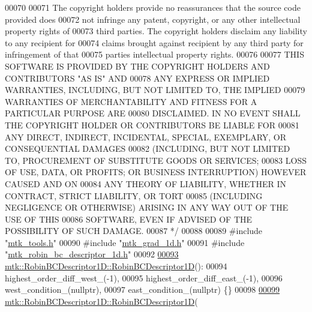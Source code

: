 \begin{DoxyCode}
00070 \textcolor{comment}{}
00071 \textcolor{comment}{The copyright holders provide no reassurances that the source code provided does}
00072 \textcolor{comment}{not infringe any patent, copyright, or any other intellectual property rights of}
00073 \textcolor{comment}{third parties. The copyright holders disclaim any liability to any recipient for}
00074 \textcolor{comment}{claims brought against recipient by any third party for infringement of that}
00075 \textcolor{comment}{parties intellectual property rights.}
00076 \textcolor{comment}{}
00077 \textcolor{comment}{THIS SOFTWARE IS PROVIDED BY THE COPYRIGHT HOLDERS AND CONTRIBUTORS "AS IS" AND}
00078 \textcolor{comment}{ANY EXPRESS OR IMPLIED WARRANTIES, INCLUDING, BUT NOT LIMITED TO, THE IMPLIED}
00079 \textcolor{comment}{WARRANTIES OF MERCHANTABILITY AND FITNESS FOR A PARTICULAR PURPOSE ARE}
00080 \textcolor{comment}{DISCLAIMED. IN NO EVENT SHALL THE COPYRIGHT HOLDER OR CONTRIBUTORS BE LIABLE FOR}
00081 \textcolor{comment}{ANY DIRECT, INDIRECT, INCIDENTAL, SPECIAL, EXEMPLARY, OR CONSEQUENTIAL DAMAGES}
00082 \textcolor{comment}{(INCLUDING, BUT NOT LIMITED TO, PROCUREMENT OF SUBSTITUTE GOODS OR SERVICES;}
00083 \textcolor{comment}{LOSS OF USE, DATA, OR PROFITS; OR BUSINESS INTERRUPTION) HOWEVER CAUSED AND ON}
00084 \textcolor{comment}{ANY THEORY OF LIABILITY, WHETHER IN CONTRACT, STRICT LIABILITY, OR TORT}
00085 \textcolor{comment}{(INCLUDING NEGLIGENCE OR OTHERWISE) ARISING IN ANY WAY OUT OF THE USE OF THIS}
00086 \textcolor{comment}{SOFTWARE, EVEN IF ADVISED OF THE POSSIBILITY OF SUCH DAMAGE.}
00087 \textcolor{comment}{*/}
00088 
00089 \textcolor{preprocessor}{#include "\hyperlink{mtk__tools_8h}{mtk\_tools.h}"}
00090 \textcolor{preprocessor}{#include "\hyperlink{mtk__grad__1d_8h}{mtk\_grad\_1d.h}"}
00091 \textcolor{preprocessor}{#include "\hyperlink{mtk__robin__bc__descriptor__1d_8h}{mtk\_robin\_bc\_descriptor\_1d.h}"}
00092 
\hypertarget{mtk__robin__bc__descriptor__1d_8cc_source_l00093}{}\hyperlink{classmtk_1_1RobinBCDescriptor1D_a49ae1e976c1a6d8aa227d3dc16090127}{00093} \hyperlink{classmtk_1_1RobinBCDescriptor1D_a49ae1e976c1a6d8aa227d3dc16090127}{mtk::RobinBCDescriptor1D::RobinBCDescriptor1D}():
00094   highest\_order\_diff\_west\_(-1),
00095   highest\_order\_diff\_east\_(-1),
00096   west\_condition\_(nullptr),
00097   east\_condition\_(nullptr) \{\}
00098 
\hypertarget{mtk__robin__bc__descriptor__1d_8cc_source_l00099}{}\hyperlink{classmtk_1_1RobinBCDescriptor1D_ac8d3d6f0b5b1882e098b89cc212fffa1}{00099} \hyperlink{classmtk_1_1RobinBCDescriptor1D_a49ae1e976c1a6d8aa227d3dc16090127}{mtk::RobinBCDescriptor1D::RobinBCDescriptor1D}(

\end{DoxyCode}
